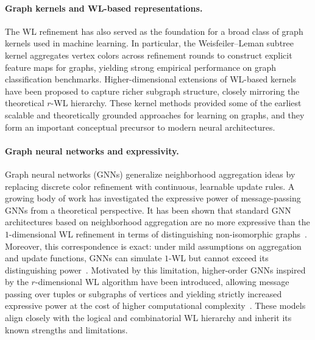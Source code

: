 \paragraph{Graph kernels and WL-based representations.}
The WL refinement has also served as the foundation for a broad class of graph kernels used in machine learning. In particular, the Weisfeiler--Leman subtree kernel aggregates vertex colors across refinement rounds to construct explicit feature maps for graphs, yielding strong empirical performance on graph classification benchmarks. Higher-dimensional extensions of WL-based kernels have been proposed to capture richer subgraph structure, closely mirroring the theoretical $r$-WL hierarchy. These kernel methods provided some of the earliest scalable and theoretically grounded approaches for learning on graphs, and they form an important conceptual precursor to modern neural architectures.

\paragraph{Graph neural networks and expressivity.}
Graph neural networks (GNNs) generalize neighborhood aggregation ideas by replacing discrete color refinement with continuous, learnable update rules. A growing body of work has investigated the expressive power of message-passing GNNs from a theoretical perspective. It has been shown that standard GNN architectures based on neighborhood aggregation are no more expressive than the $1$-dimensional WL refinement in terms of distinguishing non-isomorphic graphs~\cite{XuEtAl2019,MorrisEtAl2019}. Moreover, this correspondence is exact: under mild assumptions on aggregation and update functions, GNNs can simulate $1$-WL but cannot exceed its distinguishing power~\cite{XuEtAl2019,MorrisEtAl2019}. Motivated by this limitation, higher-order GNNs inspired by the $r$-dimensional WL algorithm have been introduced, allowing message passing over tuples or subgraphs of vertices and yielding strictly increased expressive power at the cost of higher computational complexity~\cite{MorrisEtAl2019}. These models align closely with the logical and combinatorial WL hierarchy and inherit its known strengths and limitations.
